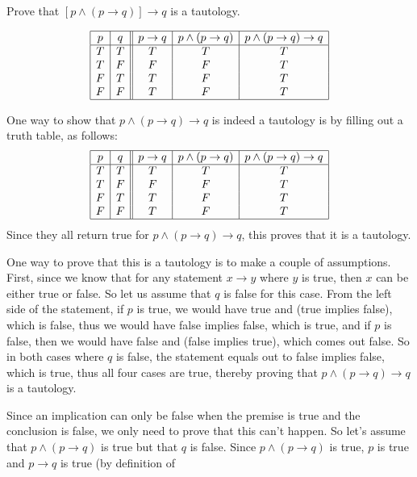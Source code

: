 \begin{eval}
Prove that $[p\wedge (p  \rightarrow q)] \rightarrow q$ is a tautology.
\begin{spfenum}
\item 
$$\begin{array}{|c|c||c|c|c|}
\hline
p&q&p\rightarrow q&p\wedge(p\rightarrow q)&p\wedge(p\rightarrow q)\rightarrow q\\
\hline
T&T&T&T&T\\
T&F&F&F&T\\
F&T&T&F&T\\
F&F&T&F&T\\
\hline
\end{array}$$
\evallinetwo
\item
One way to show that $p\wedge(p\rightarrow q)\rightarrow q$ is indeed a tautology is by filling out a truth table,
as follows:
$$\begin{array}{|c|c||c|c|c|}
\hline
p&q&p\rightarrow q&p\wedge(p\rightarrow q)&p\wedge(p\rightarrow q)\rightarrow q\\
\hline
T&T&T&T&T\\
T&F&F&F&T\\
F&T&T&F&T\\
F&F&T&F&T\\
\hline
\end{array}$$
Since they all return true for $p\wedge(p\rightarrow q)\rightarrow q$, this proves that it is a tautology.\\
\evallinethree
\item
One way to prove that this is a tautology is to make a couple of assumptions.
First, since we know that for any statement $x\rightarrow y$ where $y$ is true, then $x$ can
be either true or false.  So let us assume that $q$ is false for this case.
From the left side of the statement, if $p$ is true, we would have true and (true implies false), which is false,
thus we would have false implies false, which is true, and if $p$ is false, then we would 
have false and (false implies true), which comes out false.
So in both cases where $q$ is false, the statement equals out to false implies false, which is true,
thus all four cases are true, thereby proving that $p\wedge(p\rightarrow q)\rightarrow q$ is a tautology.\\
\evallinethree
\item
Since an implication can only be false when the premise is true and the conclusion is false, we only need
to prove that this can't happen. So let's assume that $p\wedge(p\rightarrow q)$ is true but that
$q$ is false.  Since $p\wedge(p\rightarrow q)$ is true, $p$ is true and $p\rightarrow q$ is true (by definition of

\end{spfenum}
\end{eval}
